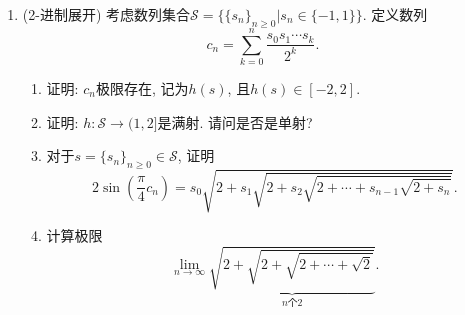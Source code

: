 \documentclass[UTF8,11pt, a4paper, oneside, fontset=none]{ctexbook}
\begin{document}
\begin{enumerate}
\begin{enumerate}
\item 证明: 相邻渐进分数之差满足:
\[
\frac{p_n}{q_n} - \frac{p_{n-1}}{q_{n-1}} = \frac{(-1)^{n+1}}{q_{n-1}q_n}, \forall n \geq 1.
\]

\item 证明: $\lim_{n \to \infty} \frac{p_n}{q_n}$极限存在, 定义为无限连分数的值, 记为$\alpha$.

\item 证明: $\alpha$是无理数.

\item 证明: 
\[
\frac{p_0}{q_0} < \frac{p_2}{q_2} < \cdots \frac{p_{2n}}{q_{2n}} < \cdots < \alpha < \cdots < \frac{p_{2n+1}}{q_{2n+1}} < \cdots < \frac{p_3}{q_3} < \frac{p_1}{q_1}.
\]

\item 将$\frac{1 + \sqrt 5}{2}$展开为无限连分数. 这个无理数的渐进分数分母恰为Fibonacci数列. 尝试推到该数列的通项公式.

\item 证明: 当$n \geq 0$时,
\[
\frac{1}{q_n(q_n + q_{n+1})} < \Big| \alpha - \frac{p_n}{q_n} \Big| < \frac{1}{q_n q_{n+1}}.
\]

\item 证明:
\[
|q_0 \alpha - p_0| > |q_1 \alpha - p_1| > \cdots > |q_n \alpha - p_n| > \cdots.
\]

\item 证明: 若$p, q$为正整数使得
\[
|q \alpha -p| < |q_n \alpha -p_n|,
\]
则$q \geq q_{n+1}$对某个$n \geq 0$成立.

\end{enumerate}

\item (2-进制展开) 考虑数列集合$\mathcal S = \{ \{s_n \}_{n \geq 0} \Big| s_n \in \{-1, 1 \} \}$. 定义数列
\[
c_n = \sum_{k=0}^n \frac{s_0 s_1 \cdots s_k}{2^k}.
\]

\begin{enumerate}

\item 证明: $c_n$极限存在, 记为$h(s)$, 且$h(s) \in [-2, 2]$.

\item 证明: $h : \mathcal S \to (1, 2 ]$是满射. 请问是否是单射?

\item 对于$s = \{ s_n\}_{n \geq 0} \in \mathcal S$, 证明
\[
2 \sin\left( \frac{\pi}{4} c_n \right)= s_0 \sqrt{2 + s_1 \sqrt{2 + s_2 \sqrt{2 + \cdots + s_{n-1} \sqrt{2 + s_n}}}}.
\]

\item 计算极限
\[
\lim_{n \to \infty} \underbrace{\sqrt{2 + \sqrt{2 + \sqrt{2 + \cdots + \sqrt 2}}}}_{\text{$n$个2}}.
\]

\end{enumerate}

\end{enumerate}
\clearpage
\end{document}
